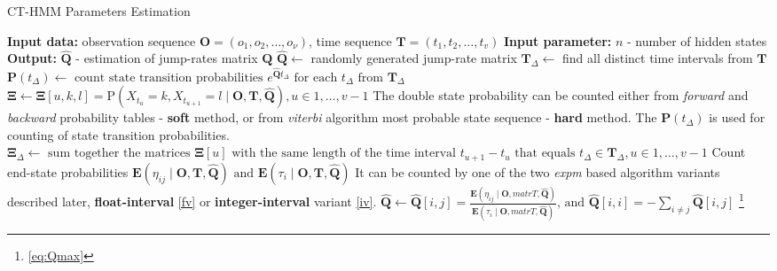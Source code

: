 \documentclass[thesis=M,english]{FITthesis}[2012/10/20]
\newcommand{\matr}[1]{\mathbf{#1}}
\begin{document}
\noindent\begin{minipage}{\textwidth} 
\renewcommand\footnoterule{}
\begin{algorithm}[H]
\caption{CT-HMM Parameters Estimation}\label{pe} 
\begin{algorithmic}[1]
\State \textbf{Input data:} observation sequence $\matr{O} = (o_1,o_2,\dots,o_{\nu})$, time sequence $\matr{T} = (t_1,t_2,\dots,t_v)$
\State \textbf{Input parameter:} $n$ - number of hidden states
\State \textbf{Output:} $\matr{\hat{Q}}$ - estimation of jump-rates matrix $\matr{Q}$
\State $\matr{\hat{Q}} \gets$ randomly generated jump-rate matrix
\State $\matr{T}_{\Delta} \gets$ find all distinct time intervals from $\matr{T}$
\Repeat
\State $\matr{P}({t_{\Delta}}) \gets \text{ count state transition probabilities } e^{\matr{\hat Q}t_{\Delta}} \text{ for each } t_{\Delta} \text{ from } \matr{T}_{\Delta}$
\State $\matr{\Xi} \gets \matr{\Xi}[u,k,l] = \mathrm{P}( X_{t_u} = k, X_{t_{u+1}} = l \mid \matr{O},\matr{T}, \matr{ \hat Q }),  u \in 1,\dots,v-1$
\State \Comment The double state probability can be counted either from \textit{forward} and \textit{backward} probability tables - \textbf{soft} method, or from \textit{viterbi} algorithm most probable state sequence - \textbf{hard} method. The $\matr{P}({t_{\Delta}})$ is used for counting of state transition probabilities. 
\State $\matr{\Xi}_{\Delta} \gets \text{ sum together the matrices } \matr{\Xi}[u] \text{ with the same length of the time interval } t_{u+1} - t_u \text{ that equals } t_{\Delta} \in \matr{T}_{\Delta}, u \in 1,\dots,v-1 $
\State Count end-state probabilities $\mathbf{E}(\eta_{ij} \mid \matr{O}, \matr{T}, \matr{ \hat Q } ) \text{ and } \mathbf{E}(\tau_{i} \mid \matr{O}, \matr{T}, \matr{ \hat Q })$
\State \Comment It can be counted by one of the two \textit{expm} based algorithm variants described later, \textbf{float-interval} \ref{fv} or \textbf{integer-interval} variant \ref{iv}.  
\State $\matr{\hat{Q}} \gets \matr{\hat{Q}}[i,j] = \frac{\mathbf{E}(\eta_{ij} \mid \matr{O}, matr{T}, \matr{ \hat Q } )}{\mathbf{E}(\tau_{i} \mid \matr{O}, matr{T}, \matr{ \hat Q })} \text{, and } \matr{\hat{Q}}[i,i] =  - \sum_{i \neq j} \matr{\hat{Q}}[i,j]$ \footnote{\label{refqmax}\eqref{eq:Qmax}}

\EndProcedure
\end{algorithmic}

\end{algorithm}

\end{minipage}
\end{document}
